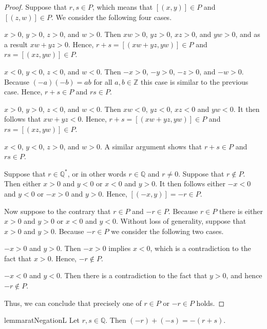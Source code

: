 \begin{proof}
	Suppose that $r, s \in P$, which means that $[(x, y)] \in P$ and $[(z, w)] \in P$. We consider the following four cases.
	\begin{bycases}
		\item $x > 0$, $y > 0$, $z > 0$, and $w > 0$. Then $x w > 0$, $y z > 0$, $x z > 0$, and $y w > 0$, and as a result $x w + y z > 0$. Hence, $r + s = [(x w + y z, y w)] \in P$ and $rs = [(x z, y w)] \in P$.
		\item $x < 0$, $y < 0$, $z < 0$, and $w < 0$. Then $-x > 0$, $-y > 0$, $-z > 0$, and $-w > 0$. Because $(-a)(-b) = a b$ for all $a, b \in \mathbb{Z}$ this case is similar to the previous case. Hence, $r + s \in P$ and $rs \in P$.
		\item $x > 0$, $y > 0$, $z < 0$, and $w < 0$. Then $x w < 0$, $y z < 0$, $x z < 0$ and $y w < 0$. It then follows that $x w + y z < 0$. Hence, $r + s = [(x w + y z, y w)] \in P$ and $rs = [(x z, y w)] \in P$.
		\item $x < 0$, $y < 0$, $z > 0$, and $w > 0$. A similar argument shows that $r + s \in P$ and $rs \in P$.
	\end{bycases}

	Suppose that $r \in \mathbb{Q}^{*}$, or in other words $r \in \mathbb{Q}$ and $r \not= 0$. Suppose that $r \notin P$. Then either $x > 0$ and $y < 0$ or $x < 0$ and $y > 0$. It then follows either $-x < 0$ and $y < 0$ or $-x > 0$ and $y > 0$. Hence, $[(-x, y)] = -r \in P$.

	Now suppose to the contrary that $r \in P$ and $-r \in P$. Because $r \in P$ there is either $x > 0$ and $y > 0$ or $x < 0$ and $y < 0$. Without loss of generality, suppose that $x > 0$ and $y > 0$. Because $-r \in P$ we consider the following two cases.
	\begin{bycases}
		\item $-x > 0$ and $y > 0$. Then $-x > 0$ implies $x < 0$, which is a contradiction to the fact that $x > 0$. Hence, $-r \notin P$.
		\item $-x < 0$ and $y < 0$. Then there is a contradiction to the fact that $y > 0$, and hence $-r \notin P$.
	\end{bycases}

	Thus, we can conclude that precisely one of $r \in P$ or $-r \in P$ holds.
\end{proof}


\Newpage
\begin{restatable}{lemma}{ratNegationL} %
	\label{rat:l:negation}
	Let $r, s \in \mathbb{Q}$. Then $(-r) + (-s) = -(r + s)$.
\end{restatable}

